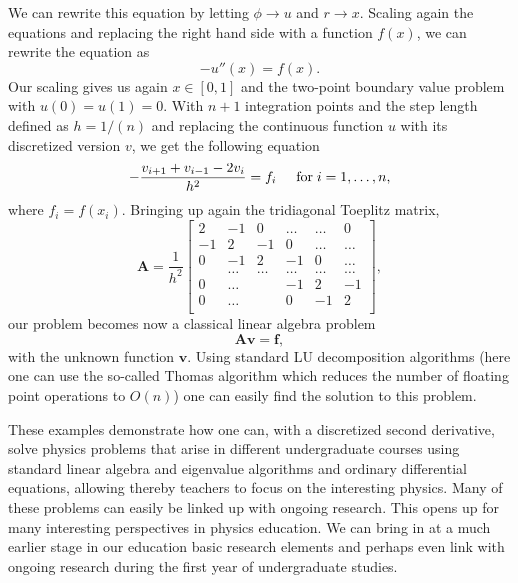 \documentclass[graybox,envcountchap,sectrefs]{svmult}
\begin{document}
We can  rewrite this equation by letting $\phi\rightarrow u$ and
$r\rightarrow x$.  Scaling again the equations and replacing the right hand side with a function $f(x)$, we can rewrite the
equation as
\[
-u''(x) = f(x).
\]
Our scaling gives us again $x\in [0,1]$ and the two-point boundary value problem
with $u(0)=u(1)=0$. With $n+1$ integration points and
the step length defined as $h=1/(n)$ and replacing the continuous function $u$ with its discretized version $v$, we get
the following equation
\begin{equation*}
   -\frac{v_{i+1}+v_{i-1}-2v_i}{h^2} = f_i  \hspace{0.5cm} \mathrm{for} \hspace{0.1cm} i=1,\dots, n,
\end{equation*}
where $f_i=f(x_i)$.
Bringing up again the tridiagonal Toeplitz matrix,
\[
    \mathbf{A} = \frac{1}{h^2}\begin{bmatrix}
                           2& -1& 0 &\dots   & \dots &0 \\
                           -1 & 2 & -1 &0 &\dots &\dots \\
                           0&-1 &2 & -1 & 0 & \dots \\
                           & \dots   & \dots &\dots   &\dots & \dots \\
                           0&\dots   &  &-1 &2& -1 \\
                           0&\dots    &  & 0  &-1 & 2 \\
                      \end{bmatrix},
\]
our problem becomes now a classical linear algebra problem
\[
\mathbf{A}\mathbf{v}=\mathbf{f},
\]
with the unknown function $\mathbf{v}$. Using standard LU
decomposition algorithms \cite{LUalgo,Thomasalgo} (here one can use
the so-called Thomas algorithm which reduces the number of floating
point operations to $O(n)$) one can easily find the solution to this
problem.

These examples demonstrate how one can, with a discretized second
derivative, solve physics problems that arise in different
undergraduate courses using standard linear algebra and eigenvalue
algorithms and ordinary differential equations, allowing thereby
teachers to focus on the interesting physics. Many of these problems
can easily be linked up with ongoing research. This opens up for many
interesting perspectives in physics education. We can bring in at a
much earlier stage in our education basic research elements and
perhaps even link with ongoing research during the first year of
undergraduate studies.
\end{document}
